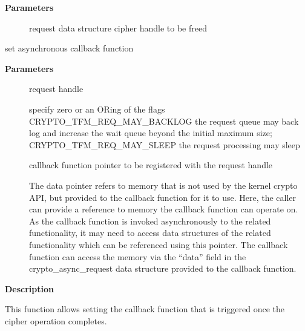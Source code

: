 \documentclass[a4paper,8pt,english]{sphinxmanual}
\begin{document}
\textbf{Parameters}
\begin{description}
\item[{}] \leavevmode
request data structure cipher handle to be freed

\end{description}

\begin{fulllineitems}
\label{crypto/api-skcipher:c.skcipher_request_set_callback}
set asynchronous callback function

\end{fulllineitems}


\textbf{Parameters}
\begin{description}
\item[{}] \leavevmode
request handle

\item[{}] \leavevmode
specify zero or an ORing of the flags
CRYPTO\_TFM\_REQ\_MAY\_BACKLOG the request queue may back log and
increase the wait queue beyond the initial maximum size;
CRYPTO\_TFM\_REQ\_MAY\_SLEEP the request processing may sleep

\item[{}] \leavevmode
callback function pointer to be registered with the request handle

\item[{}] \leavevmode
The data pointer refers to memory that is not used by the kernel
crypto API, but provided to the callback function for it to use. Here,
the caller can provide a reference to memory the callback function can
operate on. As the callback function is invoked asynchronously to the
related functionality, it may need to access data structures of the
related functionality which can be referenced using this pointer. The
callback function can access the memory via the ``data'' field in the
crypto\_async\_request data structure provided to the callback function.

\end{description}

\textbf{Description}

This function allows setting the callback function that is triggered once the
cipher operation completes.
\end{document}
